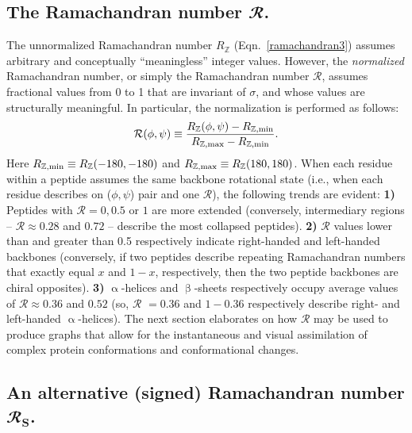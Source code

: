 \documentclass[fleqn,10pt]{wlpeerj} %
\newcommand{\Eqn}[1]{Eqn.~\ref{#1}}
\begin{document}
\subsection*{The Ramachandran number $\bm{\mathbfcal{R}}$.}
The unnormalized Ramachandran number $R_\mathbb{Z}$ (\Eqn{ramachandran3}) assumes arbitrary and conceptually ``meaningless'' integer values. However, the {\it normalized} Ramachandran number, or simply the Ramachandran number $\mathcal{R}$, assumes fractional values from 0 to 1 that are invariant of $\sigma$, and whose values are structurally meaningful. In particular, the normalization is performed as follows:
\begin{equation}
\label{ramachandran}
{\mathcal{R}}(\phi,\psi) \equiv  \frac{R_\mathbb{Z}(\phi,\psi)-R_{\mathbb{Z},\rm min}}{R_{\mathbb{Z},\rm max}-R_{\mathbb{Z},\rm min}}.
\end{equation}
Here $R_{\mathbb{Z},\rm min}\equiv R_{\mathbb{Z}}(-180,-180)$ and $R_{\mathbb{Z},\rm max}\equiv R_{\mathbb{Z}}(180,180)$.  When each residue within a peptide assumes the same backbone rotational state (i.e., when each residue describes on ($\phi,\psi$) pair and one $\mathcal{R}$), the following trends are evident: \textbf{1)} Peptides with $\mathcal{R} = 0, 0.5$ or $1$ are more extended (conversely, intermediary regions -- $\mathcal{R} \approx 0.28$ and $0.72$ -- describe the most collapsed peptides). \textbf{2)} $\mathcal{R}$ values lower than and greater than 0.5 respectively indicate right-handed and left-handed backbones (conversely, if two peptides describe repeating Ramachandran numbers that exactly equal $x$ and $1- x$, respectively, then the two peptide backbones are chiral opposites). \textbf{3)} $\upalpha$-helices and $\upbeta$-sheets respectively occupy average values of $\mathcal{R} \approx 0.36$ and $0.52$ (so, $\mathcal{R}$ $=0.36$ and $1-0.36$ respectively describe right- and left-handed $\upalpha$-helices). The next section elaborates on how $\mathcal{R}$ may be used to produce graphs that allow for the instantaneous and visual assimilation of complex protein conformations and conformational changes.

\subsection*{An alternative (signed) Ramachandran number $\bm{\mathbfcal{R}_\textrm{S}}$.} 
\label{altnumber}
\end{document}
